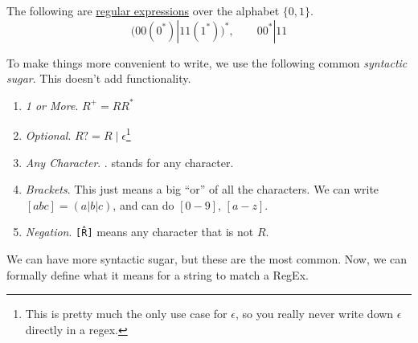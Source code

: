 	\begin{example}
	  \label{ex:regular-expressions-over-binary-alphabet}
		The following are \hyperref[def:regular_expression]{regular expressions} over the alphabet $\{0,1\}$. 
		\begin{equation}
			\big( 00(0^*)|11(1^*)\big)^*, \qquad 00^*|11
		\end{equation}
  \end{example}

  To make things more convenient to write, we use the following common \textit{syntactic sugar}. This doesn't add functionality.  
  \begin{enumerate}
    \item \textit{1 or More}. $R^+ = R R^\ast$ 
    \item \textit{Optional}. $R? = R \mid \epsilon$\footnote{This is pretty much the only use case for $\epsilon$, so you really never write down $\epsilon$ directly in a regex. }
    \item \textit{Any Character}. $.$ stands for any character. 
    \item \textit{Brackets}. This just means a big ``or'' of all the characters. We can write $[abc] = (a | b | c)$, and can do $[0-9]$, $[a-z]$. 
    \item \textit{Negation}. \texttt{[\^ R]} means any character that is not $R$. 
  \end{enumerate}

  We can have more syntactic sugar, but these are the most common. Now, we can formally define what it means for a string to match a RegEx. 

